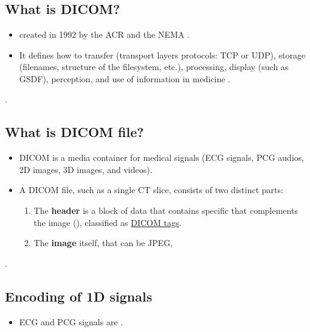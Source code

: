 \chapter{}

\section{What is DICOM?}
\begin{itemize}
\item {}
   created in 1992 by
  the \gls{ACR} and the \gls{NEMA} \cite{DICOM2025}.
\item It defines how to transfer (transport layers protocols:
  \gls{TCP} or \gls{UDP}), storage (filenames, structure of the
  filesystem, etc.), processing, display (such as \gls{GSDF}),
  perception, and use of information in medicine
  \cite{bushberg2011essential}.
\end{itemize}.


\section{What is DICOM file?}
\begin{itemize}
\item \gls{DICOM} is a media container for medical signals
  (\gls{ECG} signals, \gls{PCG} audios, 2D images, 3D images, and videos).
\item A DICOM file, such as a single CT slice, consists of two
  distinct parts:
  \begin{enumerate}
  \item The \textbf{header} is a block of data that contains specific
      that complements the image
    (), classified as
    \href{https://dicom.nema.org/medical/dicom/current/output/html/part06.html#PS3.6}{DICOM
      tags}.
    \item The \textbf{image} itself, that can be \gls{JPEG}, 
  \end{enumerate}
\end{itemize}.

\section{Encoding of 1D signals}
\begin{itemize}
\item \gls{ECG} and \gls{PCG} signals are .
\end{itemize}

